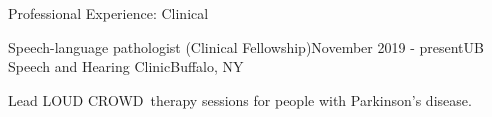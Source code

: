 \documentclass{resume} %
\begin{document}

\begin{rSection}{Professional Experience: Clinical}

	\begin{rSubsection}{Speech-language pathologist (Clinical Fellowship)}{November 2019 - present}{UB Speech and Hearing Clinic}{Buffalo, NY}
	\item Lead LOUD CROWD\textregistered \ therapy sessions for people with Parkinson's disease.
	\end{rSubsection}
%
%
%
%	
%	
%	

\end{rSection}
\end{document}
